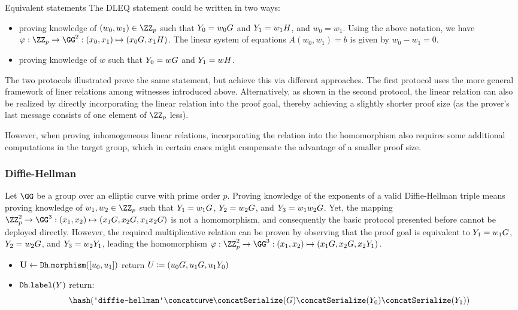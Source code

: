 \documentclass[11pt]{article}
\begin{document}
\begin{remark}{Equivalent statements}{}
  The DLEQ statement could be written in two ways:
  \begin{itemize}
    \item proving knowledge of $(w_0,w_1)\in\ZZ_p$ such that $Y_0=w_0G$ and $Y_1=w_1H$, and $w_0=w_1$.
  Using the above notation, we have $\varphi:\ZZ_p\to\GG^2:(x_0,x_1)\mapsto (x_0G,x_1H)$.
  The linear system of equations $A(w_0,w_1)=b$ is given by $w_0-w_1=0$.

  \item proving knowledge of $w$ such that $Y_0 = wG$ and $Y_1 = w H$.
  \end{itemize}
  The two protocols illustrated prove the same statement, but achieve this via different approaches.
  The first protocol uses the more general framework of liner relations among witnesses introduced above.
  Alternatively, as shown in the second protocol, the linear relation can also be realized by  directly incorporating the linear relation into the proof goal, thereby achieving a slightly shorter proof size (as the prover's last message consists of one element of $\ZZ_p$ less).

  However, when proving inhomogeneous linear relations, incorporating the relation into the homomorphism also requires some additional computations in the target group, which in certain cases might compensate the advantage of a smaller proof size.
\end{remark}


\subsubsection{Diffie-Hellman}
Let $\GG$ be a group over an elliptic curve with prime order $p$.
Proving knowledge of the exponents of a valid Diffie-Hellman triple means proving knowledge of $w_1,w_2\in\ZZ_p$ such that $Y_1=w_1G$, $Y_2=w_2G$, and $Y_3=w_1 w_2 G$.
Yet, the mapping $\ZZ_p^2\to\GG^3:(x_1,x_2)\mapsto (x_1G,x_2G,x_1x_2G)$ is not a homomorphism, and consequently the basic protocol presented before cannot be deployed directly.
However, the required multiplicative relation can be proven by observing that the proof goal is equivalent to $Y_1=w_1G$, $Y_2=w_2G$, and $Y_3=w_2Y_1$, leading the homomorphism $\varphi:\ZZ_p^2\to\GG^3:(x_1,x_2)\mapsto(x_1G,x_2G,x_2\statement_1)$.

\begin{itemize}
  \item $\mathbf U  \gets \texttt{Dh}.\texttt{morphism}([u_0, u_1])$ return $U \coloneqq (u_0 G, u_1 G, u_1 Y_0)$
  \item $\texttt{Dh}.\texttt{label}(Y)$ return:
  \[
    \hash(\dhlabel \concat \curvectx \concat \serialize(G) \concat \serialize(\statement_0) \concat \serialize(\statement_1))
  \]
\end{itemize}
\end{document}
